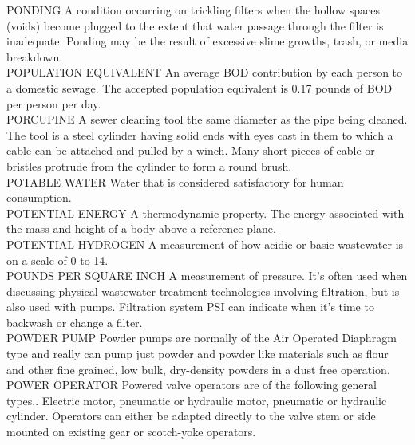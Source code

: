 \documentclass{article}
\begin{document}
PONDING
A condition occurring on trickling filters when the hollow spaces (voids) become plugged to the extent that water passage through the filter is inadequate. Ponding may be the result of excessive slime growths, trash, or media breakdown.
\vspace{0.3cm}\\
POPULATION EQUIVALENT
An average BOD contribution by each person to a domestic sewage. The accepted population equivalent is 0.17 pounds of BOD per person per day.
\vspace{0.3cm}\\
PORCUPINE
A sewer cleaning tool the same diameter as the pipe being cleaned. The tool is a steel cylinder having solid ends with eyes cast in them to which a cable can be attached and pulled by a winch. Many short pieces of cable or bristles protrude from the cylinder to form a round brush. 
\vspace{0.3cm}\\
POTABLE WATER
Water that is considered satisfactory for human consumption.
\vspace{0.3cm}\\
POTENTIAL ENERGY
A thermodynamic property. The energy associated with the mass and height of a body above a reference plane.
\vspace{0.3cm}\\
POTENTIAL HYDROGEN
A measurement of how acidic or basic wastewater is on a scale of 0 to 14.
\vspace{0.3cm}\\
POUNDS PER SQUARE INCH
A measurement of pressure. It’s often used when discussing physical wastewater treatment technologies involving filtration, but is also used with pumps. Filtration system PSI can indicate when it’s time to backwash or change a filter.
\vspace{0.3cm}\\
POWDER PUMP
Powder pumps are normally of the Air Operated Diaphragm type and really can pump just powder and powder like materials such as flour and other fine grained, low bulk, dry-density powders in a dust free operation.
\vspace{0.3cm}\\
POWER OPERATOR
Powered valve operators are of the following general types.. Electric motor, pneumatic or hydraulic motor, pneumatic or hydraulic cylinder. Operators can either be adapted directly to the valve stem or side mounted on existing gear or scotch-yoke operators.
\vspace{0.3cm}\\
\end{document}
